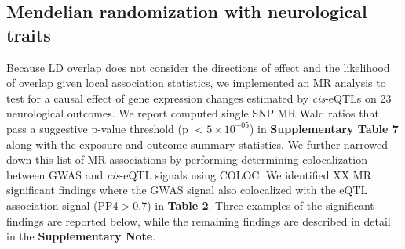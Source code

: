 \subsection{Mendelian randomization with neurological traits}
Because LD overlap does not consider the directions of effect and the likelihood of overlap given local association statistics, we implemented an MR analysis to test for a causal effect of gene expression changes estimated by \emph{cis}-eQTLs on 23 neurological outcomes. We report computed single SNP MR Wald ratios that pass a suggestive p-value threshold (p $< 5 \times 10^{-05}$) in \textbf{Supplementary Table 7} along with the exposure and outcome summary statistics. We further narrowed down this list of MR associations by performing determining colocalization between GWAS and \emph{cis}-eQTL signals using COLOC\cite{BayesianTestColocalisation}. We identified XX MR significant findings where the GWAS signal also colocalized with the eQTL association signal (PP4$>$0.7) in \textbf{Table 2}. Three examples of the significant findings are reported below, while the remaining findings are described in detail in the \textbf{Supplementary Note}. 

